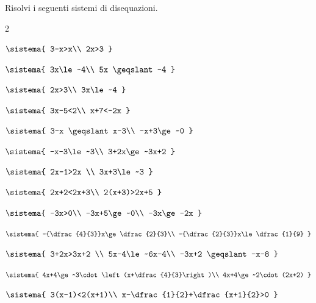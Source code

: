 
\begin{esercizio}[*]
\label{ese:21.37}
Risolvi i seguenti sistemi di disequazioni.
\begin{htmulticols}{2}
\begin{enumeratea}
\item \(\sistema{
3-x>x\\
2x>3
  }\)
\sol{\emptyset}
\item \(\sistema{
3x\le~4\\
5x \geqslant -4
}\)
\item \(\sistema{
2x>3\\
3x\le~4
  }\)
\sol{\emptyset}
\item \(\sistema{
3x-5<2\\
x+7<-2x
}\)
\item \(\sistema{
3-x \geqslant x-3\\
-x+3\ge~0
}\)
\item \(\sistema{
-x-3\le~3\\
3+2x\ge~3x+2
}\)
\item \(\sistema{
2x-1>2x \\
3x+3\le~3
}\)
\sol{\emptyset}
\item \(\sistema{
2x+2<2x+3\\
2(x+3)>2x+5
}\)
\sol{\R}
\item \(\sistema{
-3x>0\\
-3x+5\ge~0\\
-3x\ge-2x
}\)
\item {\(\sistema{
-{\dfrac{4}{3}}x\ge\dfrac{2}{3}\\
-{\dfrac{2}{3}}x\le\dfrac{1}{9}
}\)}
\sol{\emptyset}
\item \(\sistema{
3+2x>3x+2 \\
5x-4\le~6x-4\\
-3x+2 \geqslant -x-8
}\)
\item \(\sistema{
4x+4\ge~3\cdot\left(x+\dfrac{4}{3}\right)\\
4x+4\ge~2\cdot (2x+2)
}\)
\item \(\sistema{
3(x-1)<2(x+1)\\
x-\dfrac{1}{2}+\dfrac{x+1}{2}>0
}\)
\end{enumeratea}
\end{htmulticols}
\end{esercizio}

